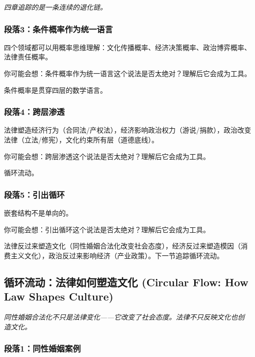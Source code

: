 \documentclass[a4paper,12pt]{book}
\newenvironment{motivation}{\begin{tcolorbox}[colback=gray!10,colframe=gray!60,title=\textit{动机}]\small\itshape}{\end{tcolorbox}}
\begin{document}
\begin{motivation}
\begin{motivation}
四章追踪的是一条连续的退化链。

	\subsubsection*{段落3：条件概率作为统一语言}
	四个领域都可以用概率思维理解：文化传播概率、经济决策概率、政治博弈概率、法律责任概率。
	\begin{tcolorbox}[colback=yellow!5, title=\textit{读者行为预测}]
		你可能会想：条件概率作为统一语言这个说法是否太绝对？理解后它会成为工具。
	\end{tcolorbox}

条件概率是贯穿四层的数学语言。

	\subsubsection*{段落4：跨层渗透}
	法律塑造经济行为（合同法/产权法），经济影响政治权力（游说/捐款），政治改变法律（立法/修宪），文化约束所有层（道德底线）。
	\begin{tcolorbox}[colback=yellow!5, title=\textit{读者行为预测}]
		你可能会想：跨层渗透这个说法是否太绝对？理解后它会成为工具。
	\end{tcolorbox}

循环流动。

	\subsubsection*{段落5：引出循环}
	嵌套结构不是单向的。
	\begin{tcolorbox}[colback=yellow!5, title=\textit{读者行为预测}]
		你可能会想：引出循环这个说法是否太绝对？理解后它会成为工具。
	\end{tcolorbox}

法律反过来塑造文化（同性婚姻合法化改变社会态度），经济反过来塑造模因（消费主义文化），政治反过来影响经济（产业政策）。下一节追踪循环流动。

	\subsection{循环流动：法律如何塑造文化 (Circular Flow: How Law Shapes Culture)}
	\begin{motivation}
		同性婚姻合法化不只是法律变化——它改变了社会态度。法律不只反映文化也创造文化。\end{motivation}
	\subsubsection*{段落1：同性婚姻案例}


\end{motivation}
\end{motivation}
\end{document}
